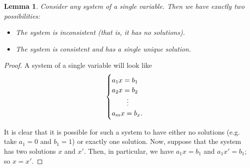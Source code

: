 \documentclass[a4paper,leqno]{article}
\numberwithin{equation}{section}
\newtheorem{lem}[equation]{Lemma}
\theoremstyle{definition}
\theoremstyle{remark}
\begin{document}
\begin{lem}
  Consider any system of a single variable. Then we have exactly two possibilities:
  \begin{itemize}
    \item The system is inconsistent (that is, it has no solutions).
    \item The system is consistent and has a single unique solution.
  \end{itemize}
\end{lem}
\begin{proof}
  A system of a single variable will look like
  \begin{equation}
    \begin{cases}
      a_1 x = b_1\\
      a_2 x = b_2\\
        \hspace{0.15em}\qquad\vdots\\
      a_m x = b_x.
    \end{cases}
  \end{equation}

  It is clear that it is possible for such a system to have either no solutions (e.g. take $ a_1 = 0 $ and $ b_1 = 1 $) or exactly one solution. Now,
  suppose that the system has two solutions $ x $ and $ x' $. Then, in particular, we have $ a_1 x = b_1 $ and $ a_1 x' = b_1 $; so $ x = x' $.
\end{proof}
\end{document}
